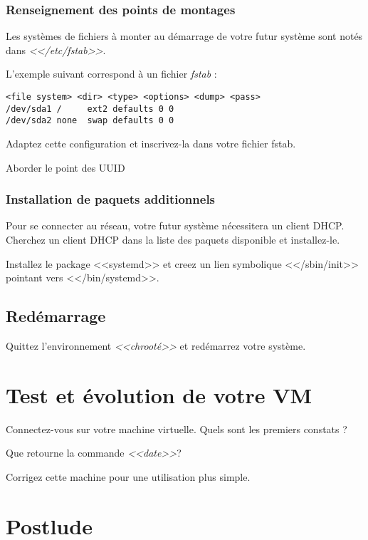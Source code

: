 \documentclass[11pt]{article}
\begin{document}
\subsubsection{Renseignement des points de montages}

Les systèmes de fichiers à monter au démarrage de votre futur système sont
notés dans \emph{<</etc/fstab>>}.

L'exemple suivant correspond à un fichier \emph{fstab} :

\begin{verbatim}
<file system> <dir> <type> <options> <dump> <pass>
/dev/sda1 /		ext2 defaults 0 0
/dev/sda2 none	swap defaults 0 0
\end{verbatim}

Adaptez cette configuration et inscrivez-la dans votre fichier fstab.

\begin{solution}
Aborder le point des UUID
\end{solution}

\subsubsection{Installation de paquets additionnels}

Pour se connecter au réseau, votre futur système nécessitera un client DHCP.
Cherchez un client DHCP dans la liste des paquets disponible et installez-le.

Installez le package <<systemd>> et creez un lien symbolique <</sbin/init>> pointant vers <</bin/systemd>>.

\subsection{Redémarrage}

Quittez l'environnement \emph{<<chrooté>>} et redémarrez votre système.

\section{Test et évolution de votre VM}

Connectez-vous sur votre machine virtuelle. Quels sont les premiers constats ?

Que retourne la commande \emph{<<date>>}?

Corrigez cette machine pour une utilisation plus simple.

\section{Postlude}
\end{document}
